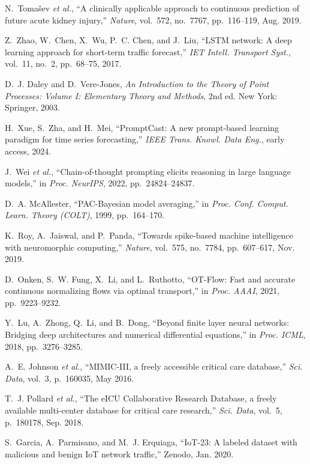 \documentclass[10pt,journal,compsoc]{IEEEtran}
\begin{document}
\begin{thebibliography}{99}
N.~Tomašev \emph{et al.}, ``A clinically applicable approach to continuous prediction of future acute kidney injury,'' \emph{Nature}, vol.~572, no.~7767, pp.~116--119, Aug. 2019.

Z.~Zhao, W.~Chen, X.~Wu, P.~C. Chen, and J.~Liu, ``LSTM network: A deep learning approach for short-term traffic forecast,'' \emph{IET Intell. Transport Syst.}, vol.~11, no.~2, pp.~68--75, 2017.

D.~J. Daley and D.~Vere-Jones, \emph{An Introduction to the Theory of Point Processes: Volume I: Elementary Theory and Methods}, 2nd ed. New York: Springer, 2003.

H.~Xue, S.~Zha, and H.~Mei, ``PromptCast: A new prompt-based learning paradigm for time series forecasting,'' \emph{IEEE Trans. Knowl. Data Eng.}, early access, 2024.

J.~Wei \emph{et al.}, ``Chain-of-thought prompting elicits reasoning in large language models,'' in \emph{Proc. NeurIPS}, 2022, pp.~24824--24837.

D.~A. McAllester, ``PAC-Bayesian model averaging,'' in \emph{Proc. Conf. Comput. Learn. Theory (COLT)}, 1999, pp.~164--170.

K.~Roy, A.~Jaiswal, and P.~Panda, ``Towards spike-based machine intelligence with neuromorphic computing,'' \emph{Nature}, vol.~575, no.~7784, pp.~607--617, Nov. 2019.

D.~Onken, S.~W. Fung, X.~Li, and L.~Ruthotto, ``OT-Flow: Fast and accurate continuous normalizing flows via optimal transport,'' in \emph{Proc. AAAI}, 2021, pp.~9223--9232.

Y.~Lu, A.~Zhong, Q.~Li, and B.~Dong, ``Beyond finite layer neural networks: Bridging deep architectures and numerical differential equations,'' in \emph{Proc. ICML}, 2018, pp.~3276--3285.

A.~E. Johnson \emph{et al.}, ``MIMIC-III, a freely accessible critical care database,'' \emph{Sci. Data}, vol.~3, p.~160035, May 2016.

T.~J. Pollard \emph{et al.}, ``The eICU Collaborative Research Database, a freely available multi-center database for critical care research,'' \emph{Sci. Data}, vol.~5, p.~180178, Sep. 2018.

S.~Garcia, A.~Parmisano, and M.~J. Erquiaga, ``IoT-23: A labeled dataset with malicious and benign IoT network traffic,'' Zenodo, Jan. 2020.


\end{thebibliography}
\end{document}
